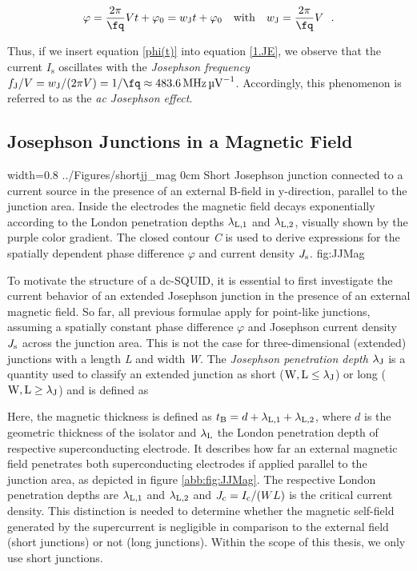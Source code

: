 \begin{equation}
\label{phi(t)}
\varphi = \frac{2\pi}{\unit{\fq}}Vt + \varphi_0 = w_\mathrm{J}t + \varphi_0 \ \ \ \mathrm{with} \ \ \ w_\mathrm{J} = \frac{2\pi}{\unit{\fq}}V \ \ .
\end{equation}

Thus, if we insert equation \eqref{phi(t)} into equation \eqref{1.JE}, we observe that  the current $I_\mathrm{s}$ oscillates with the \textit{Josephson frequency} $f_\mathrm{J}/V = w_\mathrm{J}/(2\pi V) = 1/\unit{\fq} \approx \SI{483.6}{\MHz\per\uV}$. Accordingly, this phenomenon is referred to as the \textit{ac Josephson effect}.



\subsection{Josephson Junctions in a Magnetic Field}\label{subsec_jjmag}

{width=0.8\textwidth}
{../Figures/shortjj_mag}
{0cm}
{Short Josephson junction connected to a current source in the presence of an external B-field in y-direction, parallel to the junction area. Inside the electrodes the magnetic field decays exponentially according to the London penetration depths $\lambda_{\rm L,1}$ and $\lambda_{\rm L,2}$, visually shown by the purple color gradient. The closed contour \textit{C} is used to derive expressions for the spatially dependent phase difference $\varphi$ and current density $J_{\rm s}$.} 
{fig:JJMag}

To motivate the structure of a dc-SQUID, it is essential to first investigate the current behavior of an extended Josephson junction in the presence of an external magnetic field. So far, all previous formulae apply for point-like junctions, assuming a spatially constant phase difference $\varphi$ and Josephson current density $J_{\rm s}$ across the junction area. This is not the case for three-dimensional (extended) junctions with a length \textit{L} and width \textit{W}. The \textit{Josephson penetration depth} $\lambda_{\rm J}$ is a quantity used to classify an extended junction as short ($\rm W,L \leq\lambda_{\rm J}$) or long ($\rm W,L \geq\lambda_{\rm J}$) and is defined as \cite{Weihnacht1969} 


Here, the magnetic thickness is defined as $t_{\rm B} = d + \lambda_{\rm L,1} + \lambda_{\rm L,2}$, where $d$ is the geometric thickness of the isolator and $\lambda_{\rm L}$ the London penetration depth of respective superconducting electrode. It describes how far an external magnetic field penetrates both superconducting electrodes if applied parallel to the junction area, as depicted in figure \ref{abb:fig:JJMag}. The respective London penetration depths are $\lambda_{\rm L,1}$ and $\lambda_{\rm L,2}$ and $J_{\rm c} = I_{\rm c}/(WL)$ is the critical current density.
This distinction is needed to determine whether the magnetic self-field generated by the supercurrent is negligible in comparison to the external field (short junctions) or not (long junctions). Within the scope of this thesis, we only use short junctions.  

